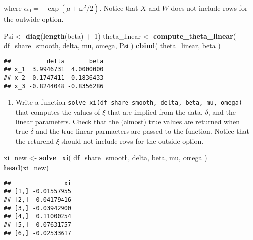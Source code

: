 \documentclass[
]{book}
\newenvironment{Shaded}{\begin{snugshade}}{\end{snugshade}}
\newcommand{\DecValTok}[1]{\textcolor[rgb]{0.00,0.00,0.81}{#1}}
\newcommand{\FunctionTok}[1]{\textcolor[rgb]{0.13,0.29,0.53}{\textbf{#1}}}
\newcommand{\NormalTok}[1]{#1}
\newcommand{\OtherTok}[1]{\textcolor[rgb]{0.56,0.35,0.01}{#1}}
\newcommand{\SpecialCharTok}[1]{\textcolor[rgb]{0.81,0.36,0.00}{\textbf{#1}}}
\providecommand{\tightlist}{%
  \setlength{\itemsep}{0pt}\setlength{\parskip}{0pt}}
\begin{document}
where \(\alpha_0 = - \exp(\mu + \omega^2/2)\). Notice that \(X\) and \(W\) does not include rows for the outwide option.

\begin{Shaded}
\begin{Highlighting}[]
\NormalTok{Psi }\OtherTok{\textless{}{-}} \FunctionTok{diag}\NormalTok{(}\FunctionTok{length}\NormalTok{(beta) }\SpecialCharTok{+} \DecValTok{1}\NormalTok{)}
\NormalTok{theta\_linear }\OtherTok{\textless{}{-}}
  \FunctionTok{compute\_theta\_linear}\NormalTok{(}
\NormalTok{    df\_share\_smooth, }
\NormalTok{    delta, }
\NormalTok{    mu, }
\NormalTok{    omega, }
\NormalTok{    Psi}
\NormalTok{    ) }
\FunctionTok{cbind}\NormalTok{(}
\NormalTok{  theta\_linear, }
\NormalTok{  beta}
\NormalTok{  )}
\end{Highlighting}
\end{Shaded}

\begin{verbatim}
##          delta       beta
## x_1  3.9946731  4.0000000
## x_2  0.1747411  0.1836433
## x_3 -0.8244048 -0.8356286
\end{verbatim}

\begin{enumerate}
\def\labelenumi{\arabic{enumi}.}
\setcounter{enumi}{10}
\tightlist
\item
  Write a function \texttt{solve\_xi(df\_share\_smooth,\ delta,\ beta,\ mu,\ omega)} that computes the values of \(\xi\) that are implied from the data, \(\delta\), and the linear parameters. Check that the (almost) true values are returned when true \(\delta\) and the true linear parmaeters are passed to the function. Notice that the returend \(\xi\) should not include rows for the outside option.
\end{enumerate}

\begin{Shaded}
\begin{Highlighting}[]
\NormalTok{xi\_new }\OtherTok{\textless{}{-}} 
  \FunctionTok{solve\_xi}\NormalTok{(}
\NormalTok{    df\_share\_smooth, }
\NormalTok{    delta, }
\NormalTok{    beta, }
\NormalTok{    mu, }
\NormalTok{    omega}
\NormalTok{    )}
\FunctionTok{head}\NormalTok{(xi\_new)}
\end{Highlighting}
\end{Shaded}

\begin{verbatim}
##               xi
## [1,] -0.01557955
## [2,]  0.04179416
## [3,] -0.03942900
## [4,]  0.11000254
## [5,]  0.07631757
## [6,] -0.02533617
\end{verbatim}
\end{document}
